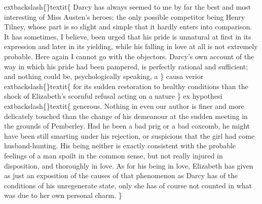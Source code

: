 \documentclass[10pt]{book}
\begin{document}
	extbackslash\{\}textit\{
    Darcy has always seemed to me by far the best and most interesting of
Miss Austen’s heroes; the only possible competitor being Henry Tilney,
whose part is so slight and simple that it hardly enters into
comparison. It has sometimes, I believe, been urged that his pride is
unnatural at first in its expression and later in its yielding, while
his falling in love at all is not extremely probable. Here again I
cannot go with the objectors. Darcy’s own account of the way in which
his pride had been pampered, is perfectly rational and sufficient; and
nothing could be, psychologically speaking, a
   \}
   causa verior
   	extbackslash\{\}textit\{
    for its
sudden restoration to healthy conditions than the shock of Elizabeth’s
scornful refusal acting on a nature
   \}
   ex hypothesi
   	extbackslash\{\}textit\{
    generous. Nothing in
even our author is finer and more delicately touched than the change of
his demeanour at the sudden meeting in the grounds of Pemberley. Had he
been a bad prig or a bad coxcomb, he might have been still smarting
under his rejection, or suspicious that the girl had come
husband-hunting. His being neither is exactly consistent with the
probable feelings of a man spoilt in the common sense, but not really
injured in disposition, and thoroughly in love. As for his being in
love, Elizabeth has given as just an exposition of the causes of that
phenomenon as Darcy has of the conditions of his unregenerate state,
only she has of course not counted in what was due to her own personal
charm.
   \}
\end{document}
